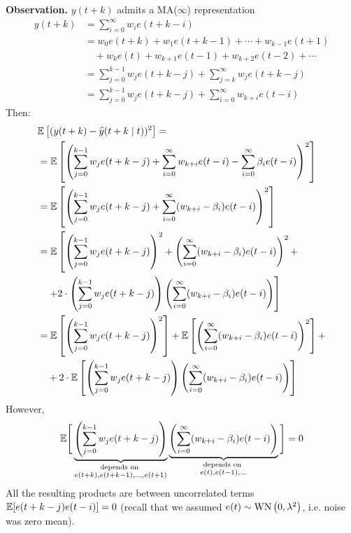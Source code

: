 \textbf{Observation.} $y(t+k)$ admits a MA($\infty$) representation
\begin{align*}
	y(t+k)&= \sum_{i=0}^{\infty} w_{i} e(t+k-i) \\
	&= w_{0} e(t+k)+w_{1} e(t+k-1)+\cdots+w_{k-1} e(t+1)\\
	&\quad + w_{k} e(t) + w_{k+1} e(t-1) + w_{k+2} e(t-2) + \cdots\\
	&=\sum_{j=0}^{k-1} w_{j} e(t+k-j)+\sum_{j=k}^{\infty} w_{j} e(t+k-j) \\
	&=\sum_{j=0}^{k-1} w_{j} e(t+k-j)+\sum_{i=0}^{\infty} w_{k+i} e(t-i)
\end{align*}
Then:
\begin{align*}
	&\mathbb{E}\left[(y(t+k)-\widehat{y}(t+k \mid t))^{2}\right]= \\
	&=\mathbb{E}\left[\left(\sum_{j=0}^{k-1} w_{j} e(t+k-j)+\sum_{i=0}^{\infty} w_{k+i} e(t-i)-\sum_{i=0}^{\infty} \beta_{i} e(t-i)\right)^{2}\right]\\
	&=\mathbb{E}\left[\left(\sum_{j=0}^{k-1} w_{j} e(t+k-j)+\sum_{i=0}^{\infty} (w_{k+i}-\beta_{i}) e(t-i)\right)^{2}\right]\\
	&=\mathbb{E}\left[\left(\sum_{j=0}^{k-1} w_{j} e(t+k-j)\right)^{2}+\left(\sum_{i=0}^{\infty} (w_{k+i}-\beta_{i}) e(t-i)\right)^{2}+\right.\\
	&\quad\left.+2\cdot\left(\sum_{j=0}^{k-1} w_{j} e(t+k-j)\right)\left(\sum_{i=0}^{\infty} (w_{k+i}-\beta_{i}) e(t-i)\right)\right]\\
	&= \mathbb{E}\left[\left(\sum_{j=0}^{k-1} w_{j} e(t+k-j)\right)^{2}\right]+\mathbb{E}\left[\left(\sum_{i=0}^{\infty} (w_{k+i}-\beta_{i}) e(t-i)\right)^{2}\right]+\\
	&\quad +2 \cdot \mathbb{E}\left[\left(\sum_{j=0}^{k-1} w_{j} e(t+k-j)\right)\left(\sum_{i=0}^{\infty} (w_{k+i}-\beta_{i}) e(t-i)\right)\right]
\end{align*}
However,
\begin{align*}
	\mathbb{E}\Bigg[\underbrace{\left(\sum_{j=0}^{k-1} w_{j} e(t+k-j)\right)}_{\substack{\text{depends on }\\e(t+k),e(t+k-1),\ldots,e(t+1)}}\underbrace{\left( \sum_{i=0}^{\infty} (w_{k+i}-\beta_{i}) e(t-i)\right)}_{\substack{\text{depends on }\\e(t),e(t-1),\ldots}}\Bigg]=0
\end{align*}
All the resulting products are between uncorrelated terms
$\mathbb{E}[e(t+k-j) e(t-i)]=0$ (recall that we assumed $e(t) \sim \operatorname{WN}\left(0, \lambda^{2}\right)$, i.e.
noise was zero mean).

